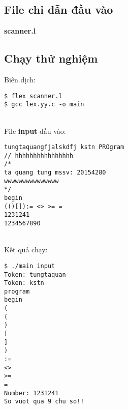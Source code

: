 \documentclass[../report.tex]{subfiles}
\begin{document}
\subsection{File chỉ dẫn đầu vào}
\textbf{scanner.l}


\subsection{Chạy thử nghiệm}
Biên dịch:
\begin{verbatim}
$ flex scanner.l
$ gcc lex.yy.c -o main
\end{verbatim}
\HRule\\
File \textbf{input} đầu vào: 
\begin{verbatim}
tungtaquangfjalskdfj kstn PROgram
// hhhhhhhhhhhhhhhh
/*
ta quang tung mssv: 20154280
wwwwwwwwwwwwwww
*/
begin
(()[]):= <> >= =
1231241
1234567890
\end{verbatim}
\HRule\\
Kết quả chạy: 
\begin{verbatim}
$ ./main input
Token: tungtaquan
Token: kstn
program
begin
(
(
)
[
]
)
:=
<>
>=
=
Number: 1231241
So vuot qua 9 chu so!!
\end{verbatim}
\end{document}
